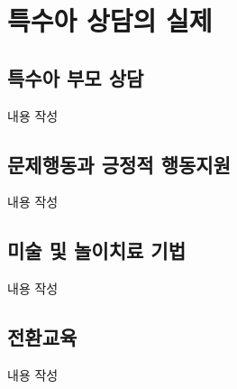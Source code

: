 \section{특수아 상담의 실제}

\subsection{특수아 부모 상담}
내용 작성

\subsection{문제행동과 긍정적 행동지원}
내용 작성

\subsection{미술 및 놀이치료 기법}
내용 작성

\subsection{전환교육}
내용 작성
